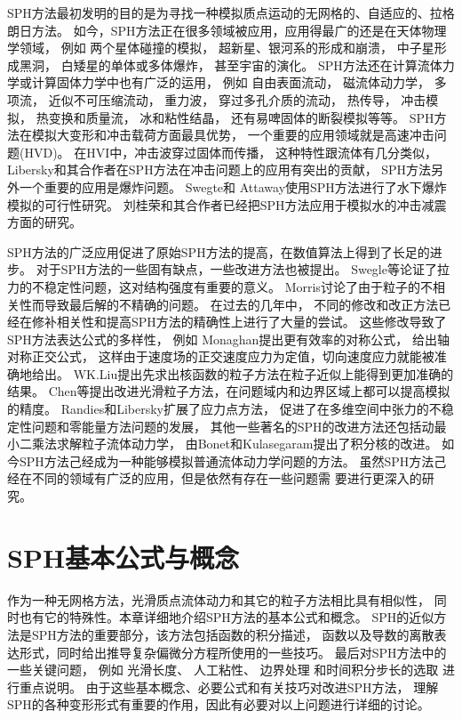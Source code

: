 SPH方法最初发明的目的是为寻找一种模拟质点运动的无网格的、自适应的、拉格朗日方法。
如今，SPH方法正在很多领域被应用，应用得最广的还是在天体物理学领域，
例如
两个星体碰撞的模拟，
超新星、银河系的形成和崩溃，
中子星形成黑洞，
白矮星的单体或多体爆炸，
甚至宇宙的演化。
SPH方法还在计算流体力学或计算固体力学中也有广泛的运用，
例如
自由表面流动，
磁流体动力学，
多项流，
近似不可压缩流动，
重力波，
穿过多孔介质的流动，
热传导，
冲击模拟，
热变换和质量流，
冰和粘性结晶，
还有易啤固体的断裂模拟等等。
SPH方法在模拟大变形和冲击载荷方面最具优势，
一个重要的应用领域就是高速冲击问题(HVD)。
在HVI中，冲击波穿过固体而传播， 这种特性跟流体有几分类似，
Libersky和其合作者在SPH方法在冲击问题上的应用有突出的贡献，
SPH方法另外一个重要的应用是爆炸问题。
Swegte和 Attaway使用SPH方法进行了水下爆炸模拟的可行性研究。
刘桂荣和其合作者已经把SPH方法应用于模拟水的冲击减震方面的研究。

SPH方法的广泛应用促进了原始SPH方法的提高，在数值算法上得到了长足的进步。
对于SPH方法的一些固有缺点，一些改进方法也被提出。
Swegle等论证了拉力的不稳定性问题，这对结构强度有重要的意义。
Morris讨论了由于粒子的不相关性而导致最后解的不精确的问题。
在过去的几年中，
不同的修改和改正方法已经在修补相关性和提高SPH方法的精确性上进行了大量的尝试。
这些修改导致了SPH方法表达公式的多样性，
例如
Monaghan提出更有效率的对称公式，
\citeauthor{Johnson1996NORMALIZED}
给出轴对称正交公式，
这样由于速度场的正交速度应力为定值，切向速度应力就能被准确地给出。
WK.Liu提出先求出核函数的粒子方法在粒子近似上能得到更加准确的结果。
Chen等提出改进光滑粒子方法，在问题域内和边界区域上都可以提高模拟的精度。
Randies和Libersky扩展了应力点方法，
促进了在多维空间中张力的不稳定性问题和零能量方法问题的发展， 
其他一些著名的SPH的改进方法还包括动最小二乘法求解粒子流体动力学，
由Bonet和Kulasegaram提出了积分核的改进。
如今SPH方法己经成为一种能够模拟普通流体动力学问题的方法。
虽然SPH方法己经在不同的领域有广泛的应用，但是依然有存在一些问题需
要进行更深入的研究。

\chapter{SPH基本公式与概念}
\label{chap:sph-base-equ}

\qquad{}作为一种无网格方法，光滑质点流体动力和其它的粒子方法相比具有相似性，
同时也有它的特殊性。本章详细地介绍SPH方法的基本公式和概念。
SPH的近似方法是SPH方法的重要部分，该方法包括函数的积分描述，
函数以及导数的离散表达形式，同时给出推导复杂偏微分方程所使用的一些技巧。
最后对SPH方法中的一些关键问题，
例如
光滑长度、
人工粘性、
边界处理
和时间积分步长的选取
进行重点说明。
由于这些基本概念、必要公式和有关技巧对改进SPH方法，
理解SPH的各种变形形式有重要的作用，因此有必要对以上问题进行详细的讨论。


